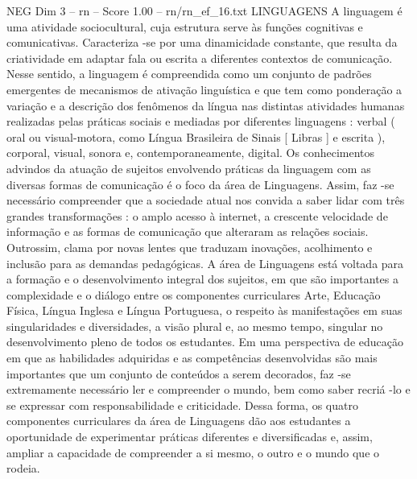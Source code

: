 \begin{textsample}{NEG Dim 3 – rn – Score 1.00 – rn/rn\_ef\_16.txt}  \label{ex:f3_neg_193}
LINGUAGENS A linguagem é uma atividade sociocultural, cuja estrutura serve às funções cognitivas e comunicativas.
Caracteriza -se por uma dinamicidade constante, que resulta da criatividade em adaptar fala ou escrita a diferentes contextos de comunicação.
Nesse sentido, a linguagem é compreendida como um conjunto de padrões emergentes de mecanismos de ativação linguística e que tem como ponderação a variação e a descrição dos fenômenos da língua nas distintas atividades humanas realizadas pelas práticas sociais e mediadas por diferentes linguagens : verbal ( oral ou visual-motora, como Língua Brasileira de Sinais [ Libras ] e escrita ), corporal, visual, sonora e, contemporaneamente, digital.
Os conhecimentos advindos da atuação de sujeitos envolvendo práticas da linguagem com as diversas formas de comunicação é o foco da área de Linguagens.
Assim, faz -se necessário compreender que a sociedade atual nos convida a saber lidar com três grandes transformações : o amplo acesso à internet, a crescente velocidade de informação e as formas de comunicação que alteraram as relações sociais.
Outrossim, clama por novas lentes que traduzam inovações, acolhimento e inclusão para as demandas pedagógicas.
A área de Linguagens está voltada para a formação e o desenvolvimento integral dos sujeitos, em que são importantes a complexidade e o diálogo entre os componentes curriculares Arte, Educação Física, Língua Inglesa e Língua Portuguesa, o respeito às manifestações em suas singularidades e diversidades, a visão plural e, ao mesmo tempo, singular no desenvolvimento pleno de todos os estudantes.
Em uma perspectiva de educação em que as habilidades adquiridas e as competências desenvolvidas são mais importantes que um conjunto de conteúdos a serem decorados, faz -se extremamente necessário ler e compreender o mundo, bem como saber recriá -lo e se expressar com responsabilidade e criticidade.
Dessa forma, os quatro componentes curriculares da área de Linguagens dão aos estudantes a oportunidade de experimentar práticas diferentes e diversificadas e, assim, ampliar a capacidade de compreender a si mesmo, o outro e o mundo que o rodeia.

\end{textsample}

